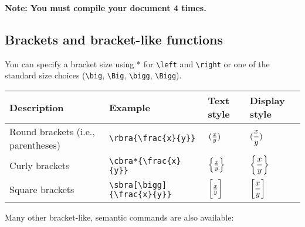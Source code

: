 \documentclass{article}
\begin{document}
\textbf{Note: You must compile your document 4 times.}

\subsection{Brackets and bracket-like functions}

You can specify a bracket size using $*$ for \verb!\left! and \verb!\right! or one of the standard size choices (\verb!\big!, \verb!\Big!, \verb!\bigg!, \verb!\Bigg!).

\begin{center}
\begin{tabular}{@{}llll@{}}
\toprule
Description 				& Example					& Text style 				& Display style \\ \midrule
Round brackets (i.e., parentheses)	& \verb!\rbra{\frac{x}{y}}!        	& $\rbra{\frac{x}{y}}$ 		& $\displaystyle\rbra{\frac{x}{y}}$ \\[10pt]
Curly brackets 			& \verb!\cbra*{\frac{x}{y}}!    	& $\cbra*{\frac{x}{y}}$ 	& $\displaystyle\cbra*{\frac{x}{y}}$ \\[10pt]
Square brackets 			& \verb!\sbra[\bigg]{\frac{x}{y}}!        	& $\sbra[\bigg]{\frac{x}{y}}$ 	& $\displaystyle\sbra[\bigg]{\frac{x}{y}}$ \\[10pt]
\bottomrule
\end{tabular}
\end{center}

Many other bracket-like, semantic commands are also available:
\end{document}
